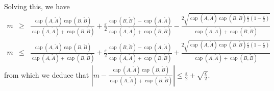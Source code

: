 \documentclass[english, aip, jcp, priprint, graphicx]{revtex4-1}
\newcommand{\tmop}[1]{\ensuremath{\operatorname{#1}}}
\theoremstyle{plain}
\theoremstyle{definition}
\theoremstyle{plain}
\begin{document}
Solving this, we have
\begin{eqnarray*}
m & \geqslant & \frac{\tmop{cap} (A, \tilde{A}) \tmop{cap} (B,
\tilde{B})}{\tmop{cap} (A, \tilde{A}) + \tmop{cap} (B, \tilde{B})} +
\frac{\varepsilon}{2} \frac{\tmop{cap} (B, \tilde{B}) - \tmop{cap} (A,
\tilde{A})}{\tmop{cap} (A, \tilde{A}) + \tmop{cap} (B, \tilde{B})} - \frac{2
\sqrt{\tmop{cap} (A, \tilde{A}) \tmop{cap} (B, \tilde{B})
\frac{\varepsilon}{2} \left( 1 - \frac{\varepsilon}{2} \right)}}{\tmop{cap}
(A, \tilde{A}) + \tmop{cap} (B, \tilde{B})}\\
m & \leqslant & \frac{\tmop{cap} (A, \tilde{A}) \tmop{cap} (B,
\tilde{B})}{\tmop{cap} (A, \tilde{A}) + \tmop{cap} (B, \tilde{B})} +
\frac{\varepsilon}{2} \frac{\tmop{cap} (B, \tilde{B}) - \tmop{cap} (A,
\tilde{A})}{\tmop{cap} (A, \tilde{A}) + \tmop{cap} (B, \tilde{B})} + \frac{2
\sqrt{\tmop{cap} (A, \tilde{A}) \tmop{cap} (B, \tilde{B})
\frac{\varepsilon}{2} \left( 1 - \frac{\varepsilon}{2} \right)}}{\tmop{cap}
(A, \tilde{A}) + \tmop{cap} (B, \tilde{B})}
\end{eqnarray*}
from which we deduce that $\left| m - \frac{\tmop{cap} (A, \tilde{A}) \tmop{cap} (B, \tilde{B})}{\tmop{cap} (A, \tilde{A}) + \tmop{cap} (B, \tilde{B})} \right| \leqslant \frac{\varepsilon}{2} + \sqrt{\frac{\varepsilon}{2}}$.
\end{document}
